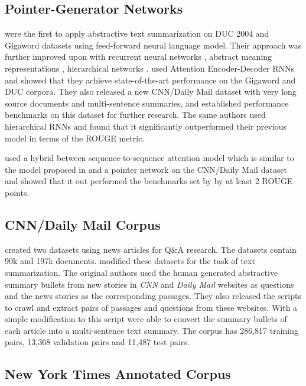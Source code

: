\documentclass[11pt,a4paper]{article}
\begin{document}
\subsection{Pointer-Generator Networks}
\citep{Rush2015} were the first to apply abstractive text summarization on DUC 2004 and Gigaword datasets using feed-forward neural language model. Their approach was further improved upon with recurrent neural networks \citep{Chopra2016}, abstract meaning representations \citep{Takase2016}, hierarchical networks \citep{Nallapati2017}. \citep{Nallapati2016} used Attention Encoder-Decoder RNNs and showed that they achieve state-of-the-art performance on the Gigaword and DUC corpora. They also released a new CNN/Daily Mail dataset with very long source documents and multi-sentence summaries, and established performance benchmarks on this dataset for further research. The same authors used hierarchical RNNs \citep{Nallapati2017} and found that it significantly outperformed their previous model in terms of the ROUGE metric.

\citep{See2017} used a hybrid between sequence-to-sequence attention model which is similar to the model proposed in \citep{Nallapati2016} and a pointer network \citep{Vinyals2015} on the CNN/Daily Mail dataset and showed that it out performed the benchmarks set by \citep{Nallapati2016} by at least 2 ROUGE points.

\subsection{CNN/Daily Mail Corpus}

\citep{Hermann2015} created two datasets using news articles for Q\&A research. The datasets contain 90k and 197k documents. \citep{Nallapati2016} modified these datasets for the task of text summarization. The original authors used the human generated abstractive summary bullets from new stories in \textit{CNN} and \textit{Daily Mail} websites as questions and the news stories as the corresponding passages. They also released the scripts to crawl and extract pairs of passages and questions from these websites. With a simple modification to this script \citep{Nallapati2016} were able to convert the summary bullets of each article into a multi-sentence text summary. The corpus has 286,817 training pairs, 13,368
validation pairs and 11,487 test pairs.

\subsection{New York Times Annotated Corpus}
\end{document}

